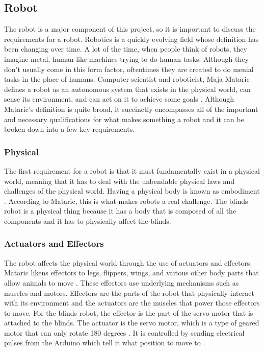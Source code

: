 \documentclass[10pt,twocolumn]{article}
\begin{document}
\subsection{Robot}
The robot is a major component of this project, so it is important to discuss the requirements for a robot. Robotics is a quickly evolving field whose definition has been changing over time. A lot of the time, when people think of robots, they imagine metal, human-like machines trying to do human tasks. Although they don’t usually come in this form factor, oftentimes they are created to do menial tasks in the place of humans. Computer scientist and roboticist, Maja Mataric defines a robot as an autonomous system that exists in the physical world, can sense its environment, and can act on it to achieve some goals \cite{Mataric2007TheRoboticsPrimer}. Although Mataric’s definition is quite broad, it succinctly encompasses all of the important and necessary qualifications for what makes something a robot and it can be broken down into a few key requirements. 

\subsubsection{Physical}
The first requirement for a robot is that it must fundamentally exist in a physical world, meaning that it has to deal with the unbendable physical laws and challenges of the physical world. Having a physical body is known as embodiment \cite{Mataric2007TheRoboticsPrimer}. According to Mataric, this is what makes robots a real challenge. The blinds robot is a physical thing because it has a body that is composed of all the components and it has to physically affect the blinds.

\subsubsection{Actuators and Effectors}
The robot affects the physical world through the use of actuators and effectors. Mataric likens effectors to legs, flippers, wings, and various other body parts that allow animals to move \cite{Mataric2007TheRoboticsPrimer}. These effectors use underlying mechanisms such as muscles and motors. Effectors are the parts of the robot that physically interact with its environment and the actuators are the muscles that power those effectors to move. For the blinds robot, the effector is the part of the servo motor that is attached to the blinds. The actuator is the servo motor, which is a type of geared motor that can only rotate 180 degrees \cite{Fitzgerald2015Arduino}. It is controlled by sending electrical pulses from the Arduino which tell it what position to move to \cite{Fitzgerald2015Arduino}.
\end{document}
